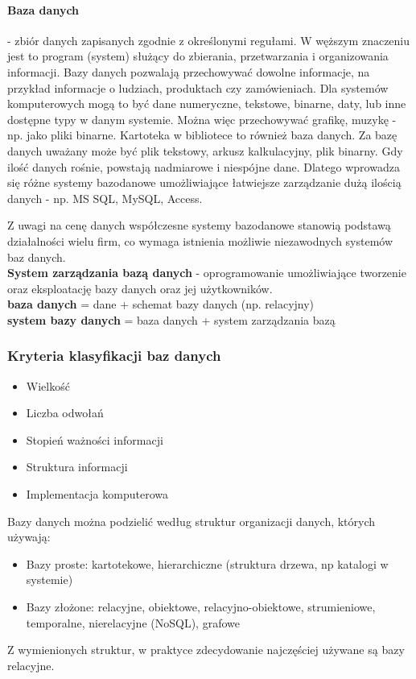 \documentclass[a4paper,twoside]{report}
\begin{document}
\paragraph{Baza danych} - zbiór danych zapisanych zgodnie z określonymi regułami. W węższym znaczeniu jest to program (system) służący do zbierania, przetwarzania i organizowania informacji. 
Bazy danych pozwalają przechowywać dowolne informacje, na przykład informacje o ludziach, produktach czy zamówieniach. Dla systemów komputerowych mogą to być dane numeryczne, tekstowe, binarne, daty, lub inne dostępne typy w danym systemie. Można więc przechowywać grafikę, muzykę - np. jako pliki binarne. Kartoteka w bibliotece to również baza danych.
 Za bazę danych uważany może być plik tekstowy, arkusz kalkulacyjny, plik binarny. Gdy ilość danych rośnie, powstają nadmiarowe i niespójne dane. Dlatego wprowadza się różne systemy bazodanowe umożliwiające łatwiejsze zarządzanie dużą ilością danych - np. MS SQL, MySQL, Access.
 
Z uwagi na cenę danych współczesne systemy bazodanowe stanowią  podstawą działalności wielu firm, co wymaga istnienia możliwie niezawodnych systemów baz danych. \\
\textbf{System zarządzania bazą danych} - oprogramowanie umożliwiające tworzenie oraz eksploatację bazy danych oraz jej użytkowników. \\
\textbf{baza danych} = dane + schemat bazy danych (np. relacyjny) \\
\textbf{system bazy danych} = baza danych + system zarządzania bazą
\medskip 


\subsubsection{Kryteria klasyfikacji baz danych}
\begin{itemize}
\item Wielkość
\item Liczba odwołań
\item Stopień ważności informacji
\item Struktura informacji
\item Implementacja komputerowa
\end{itemize}
Bazy danych można podzielić według struktur organizacji danych, których używają:
\begin{itemize}
\item Bazy proste: kartotekowe, hierarchiczne (struktura drzewa, np katalogi w systemie)
\item Bazy złożone: relacyjne, obiektowe, relacyjno-obiektowe, strumieniowe, temporalne, nierelacyjne (NoSQL), grafowe
\end{itemize}
Z wymienionych struktur, w praktyce zdecydowanie najczęściej używane są bazy relacyjne.
\medskip
\end{document}
